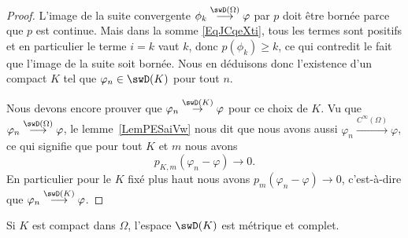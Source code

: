 \begin{proof}
    L'image de la suite convergente \( \phi_k\stackrel{\swD(\Omega)}{\longrightarrow}\varphi\) par \( p\) doit être bornée parce que \( p\) est continue. Mais dans la somme  \eqref{EqJCqeXti}, tous les termes sont positifs et en particulier le terme \( i=k\) vaut \( k\), donc \( p(\phi_k)\geq k\), ce qui contredit le fait que l'image de la suite soit bornée. Nous en déduisons donc l'existence d'un compact \( K\) tel que \( \varphi_n\in \swD(K)\) pour tout \( n\).

    Nous devons encore prouver que \( \varphi_n\stackrel{\swD(K)}{\to}\varphi\) pour ce choix de \( K\). Vu que \( \varphi_n\stackrel{\swD(\Omega)}{\longrightarrow}\varphi\), le lemme~\ref{LemPESaiVw} nous dit que nous avons aussi \( \varphi_n\stackrel{ C^{\infty}(\Omega)}{\longrightarrow}\varphi\), ce qui signifie que pour tout \( K\) et \( m\) nous avons
    \begin{equation}
        p_{K,m}(\varphi_n-\varphi)\to 0.
    \end{equation}
    En particulier pour le \( K\) fixé plus haut nous avons \( p_m(\varphi_n-\varphi)\to 0\), c'est-à-dire que \( \varphi_n\stackrel{\swD(K)}{\longrightarrow}\varphi\).

\end{proof}


\begin{proposition} \label{PropQAEVcTi}
    Si \( K\) est compact dans \( \Omega\), l'espace \( \swD(K)\) est métrique et complet.
\end{proposition}

